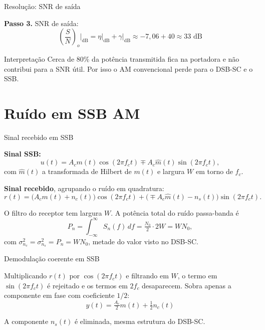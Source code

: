 
\begin{frame}{Resolução: SNR de saída}

\textbf{Passo 3.} SNR de saída:
\[
\left(\frac{S}{N}\right)_o\Big|_{\text{dB}} = \eta\big|_{\text{dB}} + \gamma\big|_{\text{dB}} \approx -7{,}06 + 40 \approx 33 \text{ dB}
\]

\begin{block}{Interpretação}
Cerca de $80\%$ da potência transmitida fica na portadora e não contribui para a SNR útil. Por isso o AM convencional perde para o DSB-SC e o SSB.
\end{block}

\end{frame}


\section{Ruído em SSB AM}

\begin{frame}{Sinal recebido em SSB}

\textbf{Sinal SSB:}
\[
u(t) = A_c m(t)\cos(2\pi f_c t) \mp A_c \hat m(t)\sin(2\pi f_c t),
\]
com $\hat m(t)$ a transformada de Hilbert de $m(t)$ e largura $W$ em torno de $f_c$.

\vspace{0.2cm}

\textbf{Sinal recebido}, agrupando o ruído em quadratura:
\[
r(t) = \bigl(A_c m(t) + n_c(t)\bigr)\cos(2\pi f_c t) + \bigl(\mp A_c \hat m(t) - n_s(t)\bigr)\sin(2\pi f_c t).
\]

\vspace{0.2cm}

O filtro do receptor tem largura $W$. A potência total do ruído passa-banda é
\[
P_n = \int_{-\infty}^{\infty} S_n(f)\,df = \tfrac{N_0}{2}\cdot 2W = W N_0,
\]
com $\sigma^2_{n_c} = \sigma^2_{n_s} = P_n = W N_0$, metade do valor visto no DSB-SC.

\end{frame}


\begin{frame}{Demodulação coerente em SSB}

Multiplicando $r(t)$ por $\cos(2\pi f_c t)$ e filtrando em $W$, o termo em $\sin(2\pi f_c t)$ é rejeitado e os termos em $2f_c$ desaparecem. Sobra apenas a componente em fase com coeficiente $1/2$:
\[
\boxed{y(t) = \tfrac{A_c}{2} m(t) + \tfrac{1}{2} n_c(t)}
\]

\vspace{0.2cm}

A componente $n_s(t)$ é eliminada, mesma estrutura do DSB-SC.

\end{frame}

